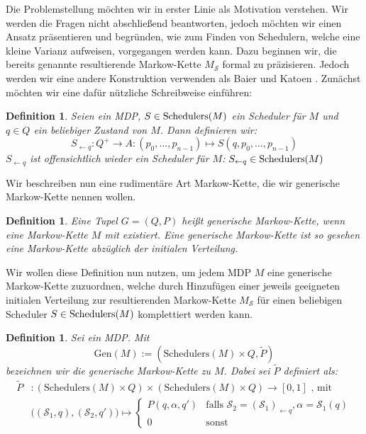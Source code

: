\documentclass[a4paper]{article}
\newcommand{\mc}{Markow-Kette}
\newtheorem{definition}[satz]{Definition} %
\theoremstyle{nonumberplain}
\begin{document}
	Die Problemstellung möchten wir in erster Linie als Motivation verstehen. Wir werden die Fragen nicht abschließend beantworten, jedoch möchten wir einen Ansatz präsentieren und begründen, wie zum Finden von Schedulern, welche eine kleine Varianz aufweisen, vorgegangen werden kann.
	Dazu beginnen wir, die bereits genannte resultierende \mc{} $M_{\mathcal{S}}$ formal zu präzisieren. Jedoch werden wir eine andere Konstruktion verwenden als Baier und Katoen \cite{Bai08}. Zunächst möchten wir eine dafür nützliche Schreibweise einführen:
	\begin{definition}
		Seien \mdpex{} ein MDP, $S\in \mathrm{Schedulers}(M)$ ein Scheduler für $M$ und $q\in Q$ ein beliebiger Zustand von $M$. Dann definieren wir:
		\begin{equation}
		S_{\leftarrow q} : Q^+ \to A : (p_0,\dots,p_{n-1}) \mapsto S(q,p_0,\dots,p_{n-1})
		\end{equation}
		$S_{\leftarrow q}$ ist offensichtlich wieder ein Scheduler für $M$: $S_{\leftarrow q} \in \mathrm{Schedulers}(M)$
	\end{definition}
	
	\newcommand{\gmc}{generische \mc{}}
	Wir beschreiben nun eine rudimentäre Art \mc{}, die wir \gmc{} nennen wollen.
	\begin{definition}
		Eine Tupel $G=(Q,P)$ heißt \gmc{}, wenn eine \mc{} $M$ mit \mcex{} existiert. Eine \gmc{} ist so gesehen eine \mc{} abzüglich der initialen Verteilung.
	\end{definition}
	
	Wir wollen diese Definition nun nutzen, um jedem MDP $M$ eine \gmc{} zuzuordnen, welche durch Hinzufügen einer jeweils geeigneten initialen Verteilung zur resultierenden \mc{} $M_\mathcal{S}$ für einen beliebigen Scheduler $S \in \mathrm{Schedulers}(M)$ komplettiert werden kann.
	
	\newcommand{\mgen}{\mathrm{Gen}}
	\begin{definition}
		Sei \mdpex{} ein MDP. Mit
		\begin{equation}
		\mgen(M):= (\mathrm{Schedulers}(M)\times Q,\tilde{P})
		\end{equation}
		bezeichnen wir die \gmc{} zu $M$. Dabei sei $\tilde{P}$ definiert als:
		\begin{align}
		\tilde{P} &: (\mathrm{Schedulers}(M)\times Q) \times (\mathrm{Schedulers}(M)\times Q) \to [0,1]\text{ , mit} \nonumber \\
		&\big((\mathcal{S}_1,q),(\mathcal{S}_2,q')\big) \mapsto \begin{cases}
		P(q,\alpha,q') & \text{falls } \mathcal{S}_2 = (\mathcal{S}_1)_{\leftarrow q}, \alpha = \mathcal{S}_1(q)\\
		0 & \text{sonst}
		\end{cases}
		\end{align}
	\end{definition}
	
\end{document}
